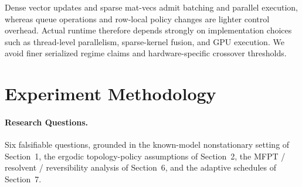 \documentclass[10pt,a4paper]{article}
\begin{document}
Dense vector updates and sparse mat-vecs admit batching and parallel execution, whereas queue operations and row-local policy changes are lighter control overhead.  Actual runtime therefore depends strongly on implementation choices such as thread-level parallelism, sparse-kernel fusion, and GPU execution.  We avoid finer serialized regime claims and hardware-specific crossover thresholds.




\section{Experiment Methodology}

\paragraph{Research Questions.}
Six falsifiable questions, grounded in the known-model nonstationary setting of Section~1,
the ergodic topology-policy assumptions of Section~2, the MFPT / resolvent / reversibility
analysis of Section~6, and the adaptive schedules of Section~7.
\end{document}
